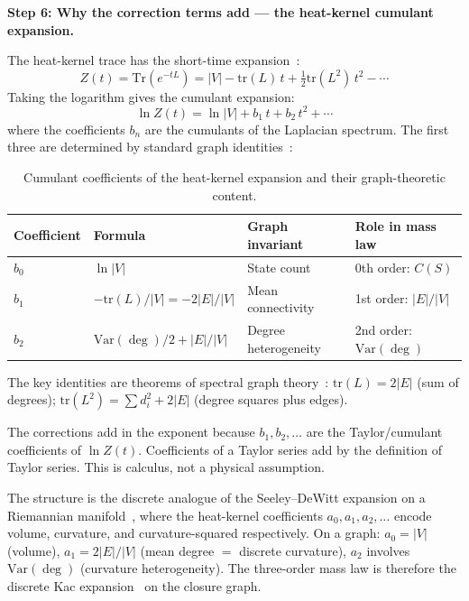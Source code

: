 \documentclass[12pt]{article}
\begin{document}
\textbf{Step 6: Why the correction terms add --- the heat-kernel cumulant expansion.}

The heat-kernel trace has the short-time expansion~\citep{Gilkey1984, Kac1966}:
\begin{equation}
    Z(t) = \mathrm{Tr}(e^{-tL}) = |V| - \mathrm{tr}(L)\, t + \tfrac{1}{2}\mathrm{tr}(L^2)\, t^2 - \cdots
\end{equation}
Taking the logarithm gives the cumulant expansion:
\begin{equation}
    \ln Z(t) = \ln |V| + b_1\, t + b_2\, t^2 + \cdots
\end{equation}
where the coefficients $b_n$ are the cumulants of the Laplacian spectrum. The first three are determined by standard graph identities~\citep{Chung1997}:

\begin{table}[ht]
\centering
\caption{Cumulant coefficients of the heat-kernel expansion and their graph-theoretic content.}
\label{tab:cumulants}
\begin{tabular}{@{}llll@{}}
\toprule
Coefficient & Formula & Graph invariant & Role in mass law \\
\midrule
$b_0$ & $\ln |V|$ & State count & 0th order: $C(S)$ \\
$b_1$ & $-\mathrm{tr}(L)/|V| = -2|E|/|V|$ & Mean connectivity & 1st order: $|E|/|V|$ \\
$b_2$ & $\mathrm{Var}(\deg)/2 + |E|/|V|$ & Degree heterogeneity & 2nd order: $\mathrm{Var}(\deg)$ \\
\bottomrule
\end{tabular}
\end{table}

The key identities are theorems of spectral graph theory~\citep{Chung1997}: $\mathrm{tr}(L) = 2|E|$ (sum of degrees); $\mathrm{tr}(L^2) = \sum d_i^2 + 2|E|$ (degree squares plus edges).

The corrections add in the exponent because $b_1, b_2, \ldots$ are the Taylor/cumulant coefficients of $\ln Z(t)$. Coefficients of a Taylor series add by the definition of Taylor series. This is calculus, not a physical assumption.

The structure is the discrete analogue of the Seeley--DeWitt expansion on a Riemannian manifold~\citep{Gilkey1984}, where the heat-kernel coefficients $a_0, a_1, a_2, \ldots$ encode volume, curvature, and curvature-squared respectively. On a graph: $a_0 = |V|$ (volume), $a_1 = 2|E|/|V|$ (mean degree $=$ discrete curvature), $a_2$ involves $\mathrm{Var}(\deg)$ (curvature heterogeneity). The three-order mass law is therefore the discrete Kac expansion~\citep{Kac1966} on the closure graph.
\end{document}
